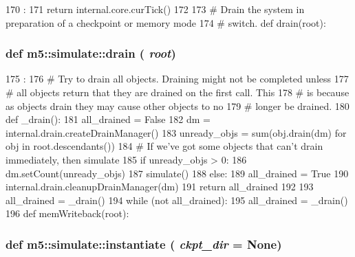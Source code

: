 \begin{DoxyCode}
170              :
171     return internal.core.curTick()
172 
173 # Drain the system in preparation of a checkpoint or memory mode
174 # switch.
def drain(root):
\end{DoxyCode}
\hypertarget{namespacem5_1_1simulate_a125fb26cebcc172aca2d13dbf5a2f73c}{
\subsubsection[{drain}]{\setlength{\rightskip}{0pt plus 5cm}def m5::simulate::drain ( {\em root})}}
\label{namespacem5_1_1simulate_a125fb26cebcc172aca2d13dbf5a2f73c}



\begin{DoxyCode}
175                :
176     # Try to drain all objects. Draining might not be completed unless
177     # all objects return that they are drained on the first call. This
178     # is because as objects drain they may cause other objects to no
179     # longer be drained.
180     def _drain():
181         all_drained = False
182         dm = internal.drain.createDrainManager()
183         unready_objs = sum(obj.drain(dm) for obj in root.descendants())
184         # If we've got some objects that can't drain immediately, then simulate
185         if unready_objs > 0:
186             dm.setCount(unready_objs)
187             simulate()
188         else:
189             all_drained = True
190         internal.drain.cleanupDrainManager(dm)
191         return all_drained
192 
193     all_drained = _drain()
194     while (not all_drained):
195         all_drained = _drain()
196 
def memWriteback(root):
\end{DoxyCode}
\hypertarget{namespacem5_1_1simulate_a48d1fb163c2020416869a3bfd42b7913}{
\subsubsection[{instantiate}]{\setlength{\rightskip}{0pt plus 5cm}def m5::simulate::instantiate ( {\em ckpt\_\-dir} = {\ttfamily None})}}
\label{namespacem5_1_1simulate_a48d1fb163c2020416869a3bfd42b7913}



